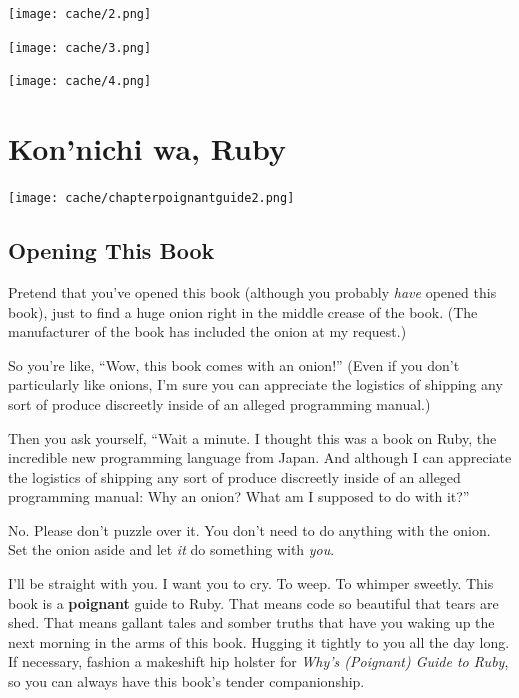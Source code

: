 \documentclass[12pt,twoside]{report}
\begin{document}
	\texttt{[image: cache/2.png]} 

	\texttt{[image: cache/3.png]} 

	\texttt{[image: cache/4.png]} 

\newpage
\thispagestyle{empty}
\mbox{}
\cleartooddpage


\chapter{Kon'nichi wa, Ruby}
\vfill
\begin{center}
  \texttt{[image: cache/chapterpoignantguide2.png]}
\end{center}
\vspace{4.6cm}
\newpage
\thispagestyle{empty}
\mbox{}
\clearpage

\section{Opening This Book}

Pretend that you've opened this book (although you probably {\em have}
opened this book), just to find a huge onion right in the middle
crease of the book.  (The manufacturer of the book has included the
onion at my request.)

So you're like, ``Wow, this book comes with an onion!''  (Even if you
don't particularly like onions, I'm sure you can appreciate the
logistics of shipping any sort of produce discreetly inside of an
alleged programming manual.)

Then you ask yourself, ``Wait a minute.  I thought this was a book on
Ruby, the incredible new programming language from Japan.  And
although I can appreciate the logistics of shipping any sort of
produce discreetly inside of an alleged programming manual: Why an
onion? What am I supposed to do with it?''

No.  Please don't puzzle over it.  You don't need to do anything with
the onion.  Set the onion aside and let {\em it} do something with
{\em you}.

I'll be straight with you.  I want you to cry.  To weep.  To whimper
sweetly.  This book is a {\bf poignant} guide to Ruby.  That means
code so beautiful that tears are shed.  That means gallant tales and
somber truths that have you waking up the next morning in the arms of
this book.  Hugging it tightly to you all the day long. If necessary,
fashion a makeshift hip holster for {\em Why's (Poignant) Guide to
  Ruby}, so you can always have this book's tender companionship.
\end{document}
